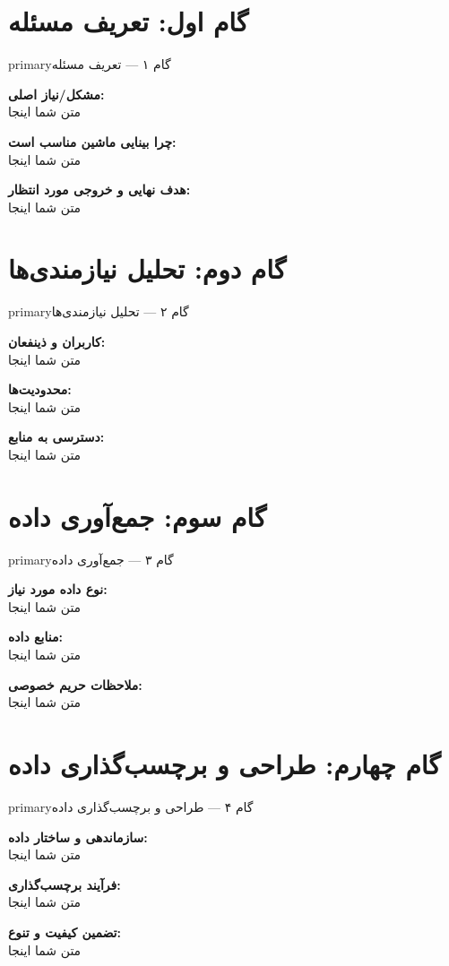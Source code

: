 \documentclass[12pt, a4paper]{article}
\begin{document}
\newpage
\tableofcontents
\newpage

\newcommand{\field}[2]{\textbf{#1:}\\ #2 \medskip}

\section{گام اول: تعریف مسئله}
\begin{stepbox}{primary}{گام ۱ — تعریف مسئله}

\field{مشکل/نیاز اصلی}{متن شما اینجا}

\field{چرا بینایی ماشین مناسب است}{متن شما اینجا}

\field{هدف نهایی و خروجی مورد انتظار}{متن شما اینجا}

\end{stepbox}

\newpage
\section{گام دوم: تحلیل نیازمندی‌ها}
\begin{stepbox}{primary}{گام ۲ — تحلیل نیازمندی‌ها}

\field{کاربران و ذینفعان}{متن شما اینجا}

\field{محدودیت‌ها}{متن شما اینجا}

\field{دسترسی به منابع}{متن شما اینجا}

\end{stepbox}

\newpage
\section{گام سوم: جمع‌آوری داده}
\begin{stepbox}{primary}{گام ۳ — جمع‌آوری داده}

\field{نوع داده مورد نیاز}{متن شما اینجا}

\field{منابع داده}{متن شما اینجا}

\field{ملاحظات حریم خصوصی}{متن شما اینجا}

\end{stepbox}

\newpage
\section{گام چهارم: طراحی و برچسب‌گذاری داده}
\begin{stepbox}{primary}{گام ۴ — طراحی و برچسب‌گذاری داده}

\field{سازماندهی و ساختار داده}{متن شما اینجا}

\field{فرآیند برچسب‌گذاری}{متن شما اینجا}

\field{تضمین کیفیت و تنوع}{متن شما اینجا}

\end{stepbox}
\end{document}
